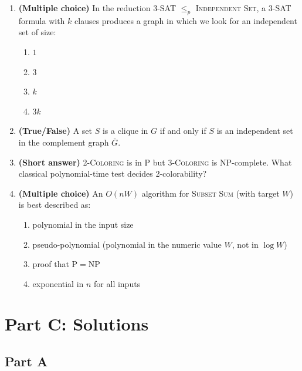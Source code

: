 \documentclass[11pt]{article}
\begin{document}
\begin{enumerate}[label=\textbf{B\arabic*.}, leftmargin=2.2em]
\item \textbf{(Multiple choice)} In the reduction \textsc{3-SAT} $\le_p$ \textsc{Independent
Set}, a 3-SAT formula with $k$ clauses produces a graph in which we look for an independent
set of size:
\begin{enumerate}[label=(\alph*)]
    \item $1$
    \item $3$
    \item $k$
    \item $3k$
\end{enumerate}

\item \textbf{(True/False)} A set $S$ is a clique in $G$ if and only if $S$ is an
independent set in the complement graph $\overline{G}$.

\item \textbf{(Short answer)} \textsc{2-Coloring} is in $\mathrm{P}$ but \textsc{3-Coloring}
is NP-complete. What classical polynomial-time test decides 2-colorability?

\item \textbf{(Multiple choice)} An $O(nW)$ algorithm for \textsc{Subset Sum} (with target
$W$) is best described as:
\begin{enumerate}[label=(\alph*)]
    \item polynomial in the input size
    \item pseudo-polynomial (polynomial in the numeric value $W$, not in $\log W$)
    \item proof that $\mathrm{P} = \mathrm{NP}$
    \item exponential in $n$ for all inputs
\end{enumerate}

\end{enumerate}

\newpage
\section*{Part C: Solutions}

\subsection*{Part A}
\end{document}
